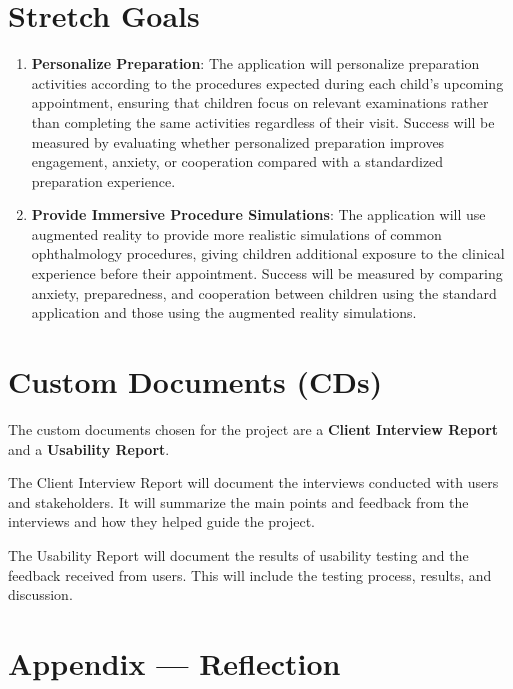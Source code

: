 \documentclass{article}
\begin{document}
\section{Stretch Goals}

\begin{enumerate}
    \item \textbf{Personalize Preparation}: The application will personalize preparation 
    activities according to the procedures expected during each child's upcoming appointment, 
    ensuring that children focus on relevant examinations rather than completing the same activities 
    regardless of their visit. Success will be measured by evaluating whether personalized preparation 
    improves engagement, anxiety, or cooperation compared with a standardized preparation experience.

    \item \textbf{Provide Immersive Procedure Simulations}: The application will use augmented reality 
    to provide more realistic simulations of common ophthalmology procedures, giving children additional 
    exposure to the clinical experience before their appointment. Success will be measured by comparing 
    anxiety, preparedness, and cooperation between children using the standard application and those using 
    the augmented reality simulations.
\end{enumerate}
\section{Custom Documents (CDs)}

The custom documents chosen for the project are a \textbf{Client Interview Report} and a \textbf{Usability Report}.

The Client Interview Report will document the interviews conducted with users and stakeholders.
It will summarize the main points and feedback from the interviews and how they helped guide the project.

The Usability Report will document the results of usability testing and the feedback received from users.
This will include the testing process, results, and discussion.

\newpage{}
\setlength{\parskip}{0.8em}
\setlength{\parindent}{0pt}

\section{Appendix --- Reflection}
\end{document}
